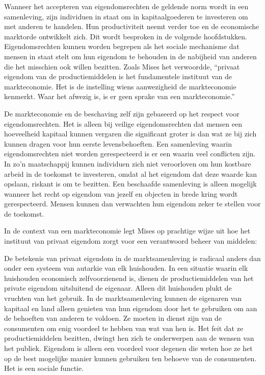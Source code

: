 Wanneer het accepteren van eigendomsrechten de geldende norm wordt in een samenleving, zijn individuen in staat om in kapitaalgoederen te investeren om met anderen te handelen. Hun productiviteit neemt verder toe en de economische marktorde ontwikkelt zich. Dit wordt besproken in de volgende hoofdstukken. Eigendomsrechten kunnen worden begrepen als het sociale mechanisme dat mensen in staat stelt om hun eigendom te behouden in de nabijheid van anderen die het misschien ook willen bezitten. Zoals Mises het verwoordde, \enquote{privaat eigendom van de productiemiddelen is het fundamentele instituut van de markteconomie. Het is de instelling wiens aanwezigheid de markteconomie kenmerkt. Waar het afwezig is, is er geen sprake van een markteconomie.}\autocite{55}

De markteconomie en de beschaving zelf zijn gebaseerd op het respect voor eigendomsrechten. Het is alleen bij veilige eigendomsrechten dat mensen een hoeveelheid kapitaal kunnen vergaren die significant groter is dan wat ze bij zich kunnen dragen voor hun eerste levensbehoeften. Een samenleving waarin eigendomsrechten niet worden gerespecteerd is er een waarin veel conflicten zijn. In zo'n maatschappij kunnen individuen zich niet veroorloven om hun kostbare arbeid in de toekomst te investeren, omdat al het eigendom dat deze waarde kan opslaan, riskant is om te bezitten. Een beschaafde samenleving is alleen mogelijk wanneer het recht op eigendom van jezelf en objecten in brede kring wordt gerespecteerd. Mensen kunnen dan verwachten hun eigendom zeker te stellen voor de toekomst.

In de context van een markteconomie legt Mises op prachtige wijze uit hoe het instituut van privaat eigendom zorgt voor een verantwoord beheer van middelen:

\begin{blockquotebox}
    De betekenis van privaat eigendom in de marktsamenleving is radicaal anders dan onder een systeem van autarkie van elk huishouden. In een situatie waarin elk huishouden economisch zelfvoorzienend is, dienen de productiemiddelen van het private eigendom uitsluitend de eigenaar. Alleen dit huishouden plukt de vruchten van het gebruik. In de marktsamenleving kunnen de eigenaren van kapitaal en land alleen genieten van hun eigendom door het te gebruiken om aan de behoeften van anderen te voldoen. Ze moeten in dienst zijn van de consumenten om enig voordeel te hebben van wat van hen is. Het feit dat ze productiemiddelen bezitten, dwingt hen zich te onderwerpen aan de wensen van het publiek. Eigendom is alleen een voordeel voor degenen die weten hoe ze het op de best mogelijke manier kunnen gebruiken ten behoeve van de consumenten. Het is een sociale functie.\footnotemark
\end{blockquotebox}

